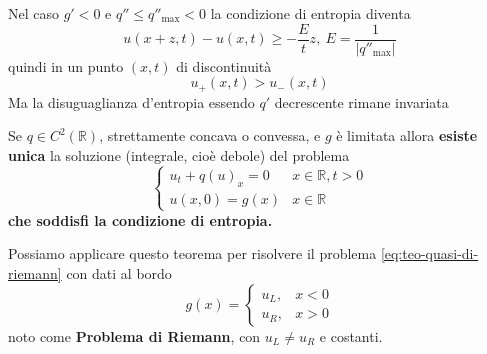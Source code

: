 \documentclass[10pt,a4paper,twoside,openright]{book}
\begin{document}
\begin{nb}
	Nel caso $\displaystyle g'< 0$ e $\displaystyle q''\leqslant q''_{\max} < 0$ la condizione di entropia diventa 
	\begin{equation*}
		u( x+z,t) -u( x,t) \geqslant -\frac{E}{t} z,\ E=\frac{1}{| q''_{\max}| }
	\end{equation*}
	quindi in un punto $\displaystyle ( x,t)$ di discontinuità
	\begin{equation*}
		u_{+}( x,t)  >u_{-}( x,t)
	\end{equation*}
	Ma la disuguaglianza d'entropia essendo $\displaystyle q'$ decrescente rimane invariata
\end{nb}
\begin{theorem}
	Se $\displaystyle q\in C^{2}(\mathbb{R})$, strettamente concava o convessa, e $\displaystyle g$ è limitata allora \textbf{esiste unica} la soluzione (integrale, cioè debole) del problema
	\begin{equation}
		\begin{cases}
			u_{t} +q( u)_{x} =0 & x\in \mathbb{R} ,t >0 \\
			u( x,0) =g( x)      & x\in \mathbb{R}       
		\end{cases}
		\label{eq:teo-quasi-di-riemann}
	\end{equation}
	\textbf{che soddisfi la condizione di entropia.}
\end{theorem}
Possiamo applicare questo teorema per risolvere il problema \eqref{eq:teo-quasi-di-riemann} con dati al bordo 
\begin{equation*}
	g( x) =
	\begin{cases}
		u_{L} , & x< 0 \\
		u_{R} , & x >0 
	\end{cases}
\end{equation*}
noto come \textbf{Problema di Riemann}, con $\displaystyle u_{L} \neq u_{R}$ e costanti.
\end{document}

